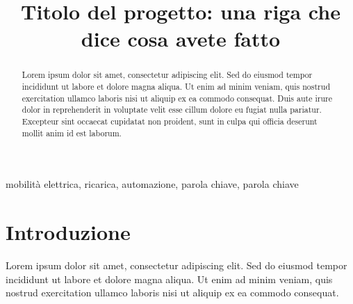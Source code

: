\documentclass[conference]{IEEEtran}
\begin{document}
\title{Titolo del progetto: una riga che dice cosa avete fatto}

\author{
  \and
  \and
}

\maketitle

\begin{abstract}
Lorem ipsum dolor sit amet, consectetur adipiscing elit. Sed do eiusmod tempor
incididunt ut labore et dolore magna aliqua. Ut enim ad minim veniam, quis
nostrud exercitation ullamco laboris nisi ut aliquip ex ea commodo consequat.
Duis aute irure dolor in reprehenderit in voluptate velit esse cillum dolore eu
fugiat nulla pariatur. Excepteur sint occaecat cupidatat non proident, sunt in
culpa qui officia deserunt mollit anim id est laborum.
\end{abstract}

\begin{IEEEkeywords}
mobilit\`a elettrica, ricarica, automazione, parola chiave, parola chiave
\end{IEEEkeywords}

\section{Introduzione}
Lorem ipsum dolor sit amet, consectetur adipiscing elit. Sed do eiusmod tempor
incididunt ut labore et dolore magna aliqua. Ut enim ad minim veniam, quis
nostrud exercitation ullamco laboris nisi ut aliquip ex ea commodo consequat.
\end{document}
